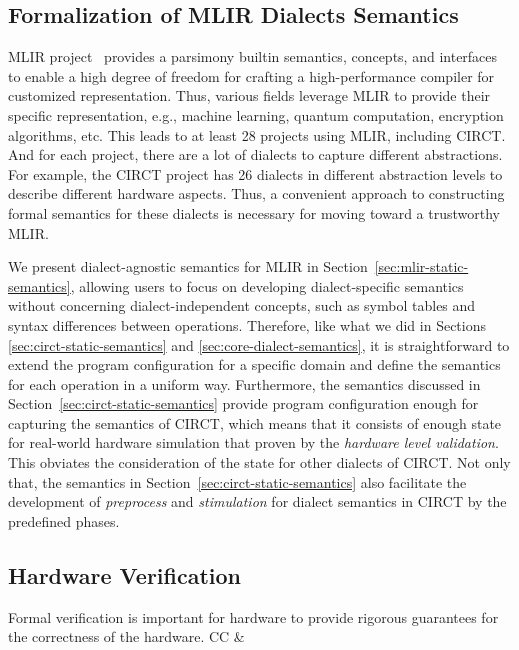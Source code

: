 \subsection{Formalization of MLIR Dialects Semantics}

MLIR project~\cite{lattnerMLIRScalingCompiler2021} provides a parsimony builtin semantics, concepts, and interfaces to enable a high degree of freedom for crafting a high-performance compiler for customized representation. Thus, various fields leverage MLIR to provide their specific representation, e.g., machine learning, quantum computation, encryption algorithms, etc. This leads to at least 28 projects using MLIR, including CIRCT. And for each project, there are a lot of dialects to capture different abstractions. For example, the CIRCT project has 26 dialects in different abstraction levels to describe different hardware aspects. Thus, a convenient approach to constructing formal semantics for these dialects is necessary for moving toward a trustworthy MLIR.

We present dialect-agnostic semantics for MLIR in Section~\ref{sec:mlir-static-semantics}, allowing users to focus on developing dialect-specific semantics without concerning dialect-independent concepts, such as symbol tables and syntax differences between operations. Therefore, like what we did in Sections \ref{sec:circt-static-semantics} and \ref{sec:core-dialect-semantics}, it is straightforward to extend the program configuration for a specific domain and define the semantics for each operation in a uniform way. Furthermore, the semantics discussed in Section~\ref{sec:circt-static-semantics} provide program configuration enough for capturing the semantics of CIRCT, which means that it consists of enough state for real-world hardware simulation that proven by the \textit{hardware level validation}. This obviates the consideration of the state for other dialects of CIRCT. Not only that, the semantics in Section~\ref{sec:circt-static-semantics} also facilitate the development of \textit{preprocess} and \textit{stimulation} for dialect semantics in CIRCT by the predefined phases. 


\subsection{Hardware Verification}

Formal verification is important for hardware to provide rigorous guarantees for the correctness of the hardware. CC \& 


